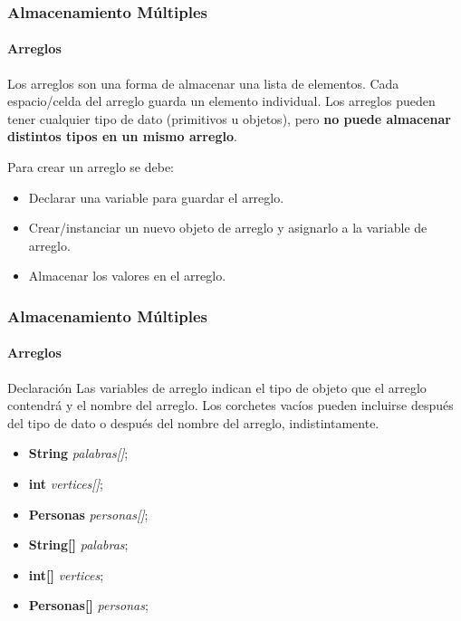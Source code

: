 \documentclass{beamer}
\begin{document}
		\begin{frame}
			\frametitle{Almacenamiento M\'ultiples}
			\framesubtitle{Arreglos}

			\begin{block}{}
			    {\scriptsize
				Los arreglos son una forma de almacenar una lista de elementos. Cada espacio/celda del arreglo guarda un elemento individual. Los arreglos pueden tener cualquier tipo de dato (primitivos u objetos), pero \textbf{no puede almacenar distintos tipos en un mismo arreglo}.
			    }
			\end{block}
			\begin{block}{}
			    {\scriptsize
				    Para crear un arreglo se debe: 
                    \begin{itemize}
                        \item Declarar una variable para guardar el arreglo.
                        \item Crear/instanciar un nuevo objeto de arreglo y asignarlo a la variable de arreglo.
                        \item Almacenar los valores en el arreglo.
                    \end{itemize}
			    }
			\end{block}
		\end{frame}

		\begin{frame}
			\frametitle{Almacenamiento M\'ultiples}
			\framesubtitle{Arreglos}

			\begin{block}{Declaraci\'on}
			    {\scriptsize
				    Las variables de arreglo indican el tipo de objeto que el arreglo contendr\'a y el nombre del arreglo. Los corchetes vac\'ios pueden incluirse despu\'es del tipo de dato o despu\'es del nombre del arreglo, indistintamente.
			    }
			\end{block}
			\begin{block}{}
			    {\scriptsize
                \begin{itemize}
                    \item[] \textbf{String} \emph{palabras[]};
                    \item[] \textbf{int} \emph{vertices[]};
                    \item[] \textbf{Personas} \emph{personas[]};
                    \item[] \textbf{String[]} \emph{palabras};
                    \item[] \textbf{int[]} \emph{vertices};
                    \item[] \textbf{Personas[]} \emph{personas};
                 \end{itemize}
			    }
			\end{block}
		\end{frame}
\end{document}
